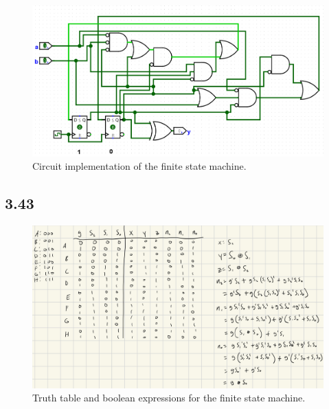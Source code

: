 \documentclass{article}
\begin{document}
\begin{figure}[H]
    \centering
    \includegraphics[width=\textwidth]{./images/3_40_circ.png}
    \caption*{Circuit implementation of the finite state machine.}
\end{figure}

\subsection*{3.43}
\begin{figure}[H]
    \centering
    \includegraphics[width=\textwidth]{./images/3_43.jpg}
    \caption*{Truth table and boolean expressions for the finite state machine.}
\end{figure}
\end{document}
